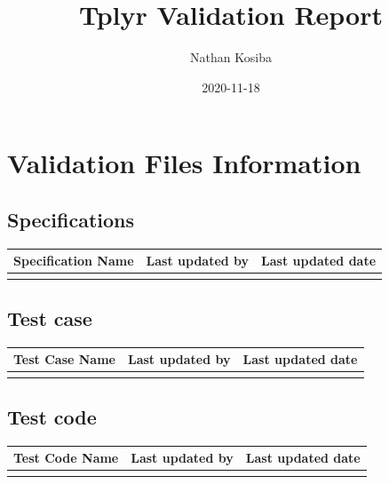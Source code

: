 \documentclass[
]{article}
\title{Tplyr Validation Report}
\author{Nathan Kosiba}
\date{2020-11-18}
\begin{document}
\maketitle

\newpage
\tableofcontents
\newpage

\hypertarget{validation-files-information}{%
\section{Validation Files
Information}\label{validation-files-information}}

\hypertarget{specifications}{%
\subsection{Specifications}\label{specifications}}

\begin{table}[H]
\centering
\begin{tabular}{lll}
\toprule
Specification Name & Last updated by & Last updated date\\
\midrule
\cellcolor{gray!6}{specification.Rmd} & \cellcolor{gray!6}{Nathan Kosiba} & \cellcolor{gray!6}{2020-11-05}\\
\bottomrule
\end{tabular}
\end{table}

\hypertarget{test-case}{%
\subsection{Test case}\label{test-case}}

\begin{table}[H]
\centering
\begin{tabular}{lll}
\toprule
Test Case Name & Last updated by & Last updated date\\
\midrule
\cellcolor{gray!6}{test\_cases.Rmd} & \cellcolor{gray!6}{Nathan Kosiba} & \cellcolor{gray!6}{2020-11-05}\\
\bottomrule
\end{tabular}
\end{table}

\hypertarget{test-code}{%
\subsection{Test code}\label{test-code}}

\begin{table}[H]
\centering
\begin{tabular}{lll}
\toprule
Test Code Name & Last updated by & Last updated date\\
\midrule
\cellcolor{gray!6}{test\_cases.R} & \cellcolor{gray!6}{Nathan Kosiba} & \cellcolor{gray!6}{2020-11-18}\\
\bottomrule
\end{tabular}
\end{table}
\end{document}
